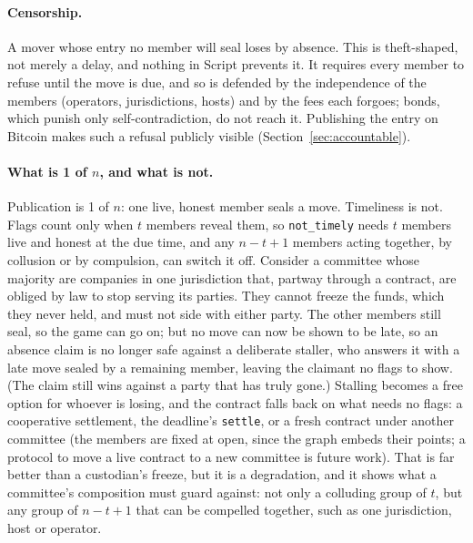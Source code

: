 \documentclass[11pt]{article}
\begin{document}
\paragraph{Censorship.} A mover whose entry no member will seal loses by
absence. This is theft-shaped, not merely a delay, and nothing in Script
prevents it. It requires every member to refuse until the move is due, and
so is defended by the independence of the members (operators,
jurisdictions, hosts) and by the fees each forgoes; bonds, which punish
only self-contradiction, do not reach it. Publishing the entry on
Bitcoin makes such a refusal publicly visible
(Section~\ref{sec:accountable}).

\paragraph{What is 1 of $n$, and what is not.} Publication is 1 of
$n$: one live, honest member seals a move. Timeliness is not. Flags
count only when $t$ members reveal them, so \texttt{not\_timely} needs $t$ members
live and honest at the due time, and any $n-t+1$ members acting
together, by collusion or by compulsion, can switch it off. Consider a
committee whose majority are companies in one jurisdiction that,
partway through a contract, are obliged by law to stop serving its
parties. They cannot freeze the funds, which they never held, and must
not side with either party. The other members still seal, so the game
can go on; but no move can now be shown to be late, so an absence claim
is no longer safe against a deliberate staller, who answers it with a
late move sealed by a remaining member, leaving the claimant no flags
to show. (The claim still wins against a party that has truly gone.)
Stalling becomes a free option for whoever is losing, and the contract
falls back on what needs no flags: a cooperative settlement, the
deadline's \texttt{settle}, or a fresh contract under another committee
(the members are fixed at open, since the graph embeds their points; a
protocol to move a live contract to a new committee is future work).
That is far better than a custodian's freeze, but it is a degradation,
and it shows what a committee's composition must guard against: not
only a colluding group of $t$, but any group of $n-t+1$ that can be
compelled together, such as one jurisdiction, host or operator.
\end{document}
